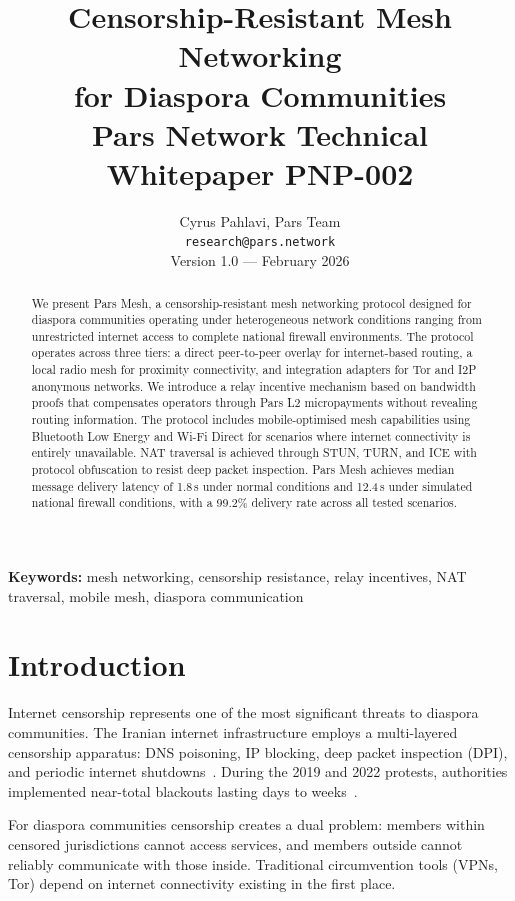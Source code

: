 \documentclass[11pt,a4paper]{article}
\title{%
    \textbf{Censorship-Resistant Mesh Networking\\
    for Diaspora Communities}\\[0.5em]
    \large Pars Network Technical Whitepaper PNP-002
}
\author{%
    Cyrus Pahlavi, Pars Team\\
    \texttt{research@pars.network}\\[0.5em]
    \small Version 1.0 --- February 2026
}
\date{}
\begin{document}
\parscoverpage

\thispagestyle{fancy}

\begin{abstract}
\noindent
We present Pars Mesh, a censorship-resistant mesh networking protocol
designed for diaspora communities operating under heterogeneous network
conditions ranging from unrestricted internet access to complete national
firewall environments.  The protocol operates across three tiers: a direct
peer-to-peer overlay for internet-based routing, a local radio mesh for
proximity connectivity, and integration adapters for Tor and I2P anonymous
networks.  We introduce a relay incentive mechanism based on bandwidth
proofs that compensates operators through Pars L2 micropayments without
revealing routing information.  The protocol includes mobile-optimised mesh
capabilities using Bluetooth Low Energy and Wi-Fi Direct for scenarios
where internet connectivity is entirely unavailable.  NAT traversal is
achieved through STUN, TURN, and ICE with protocol obfuscation to resist
deep packet inspection.  Pars Mesh achieves median message delivery latency
of 1.8\,s under normal conditions and 12.4\,s under simulated national
firewall conditions, with a 99.2\% delivery rate across all tested
scenarios.
\end{abstract}

\vspace{1em}
\noindent\textbf{Keywords:} mesh networking, censorship resistance, relay
incentives, NAT traversal, mobile mesh, diaspora communication

\tableofcontents
\newpage

\section{Introduction}
\label{sec:introduction}

Internet censorship represents one of the most significant threats to
diaspora communities.  The Iranian internet infrastructure employs a
multi-layered censorship apparatus: DNS poisoning, IP blocking, deep packet
inspection (DPI), and periodic internet shutdowns~\cite{anderson2012splinternet}.
During the 2019 and 2022 protests, authorities implemented near-total
blackouts lasting days to weeks~\cite{netblocks2022iran}.

For diaspora communities censorship creates a dual problem: members within
censored jurisdictions cannot access services, and members outside cannot
reliably communicate with those inside.  Traditional circumvention tools
(VPNs, Tor) depend on internet connectivity existing in the first place.
\end{document}
